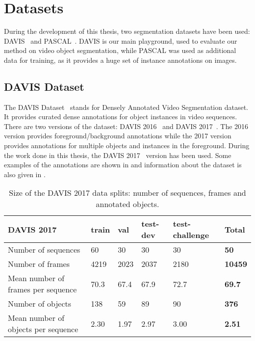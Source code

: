 \section{Datasets}

During the development of this thesis, two segmentation datasets have been used: DAVIS~\davisboth{} and PASCAL~\pascal{}.
DAVIS is our main playground, used to evaluate our method on video object segmentation, while PASCAL was used as additional data for training, as it provides a huge set of instance annotations on images.

\subsection{DAVIS Dataset}

The DAVIS Dataset~\davisboth{} stands for Densely Annotated Video Segmentation dataset.
It provides curated dense annotations for object instances in video sequences.
There are two versions of the dataset: DAVIS 2016~\davisold{} and DAVIS 2017~\davislast{}.
The 2016 version provides foreground/background annotations while the 2017 version provides annotations for multiple objects and instances in the foreground.
During the work done in this thesis, the DAVIS 2017~\davislast{} version has been used.
Some examples of the annotations are shown in  and information about the dataset is also given in .

\begin{table}[h]
  \centering
  \begin{tabular}{l|llll|l}
    \toprule
    DAVIS 2017                          & train & val  & test-dev & test-challenge & \textbf{Total} \\
    \midrule
    Number of sequences                 & 60    & 30   & 30       & 30             & \textbf{50}    \\
    Number of frames                    & 4219  & 2023 & 2037     & 2180           & \textbf{10459} \\
    Mean number of frames per sequence  & 70.3  & 67.4 & 67.9     & 72.7           & \textbf{69.7}  \\
    Number of objects                   & 138   & 59   & 89       & 90             & \textbf{376}   \\
    Mean number of objects per sequence & 2.30  & 1.97 & 2.97     & 3.00           & \textbf{2.51} \\
    \bottomrule
  \end{tabular}
  \caption{Size of the DAVIS 2017 data splits: number of sequences, frames and annotated objects.}
  \label{tab:datasets:davis}
\end{table}

